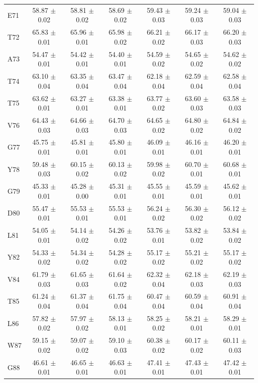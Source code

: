 \documentclass[%
 aip,
 amsmath,amssymb,
 preprint,%
]{revtex4-1}
\begin{document}
\begin{center}
\begin{longtable}{l|c|c|c|c|c|c}
E71 & 58.87 $\pm$ 0.02 & 58.81 $\pm$ 0.02 & 58.69 $\pm$ 0.02 & 59.43 $\pm$ 0.03 & 59.24 $\pm$ 0.03 & 59.04 $\pm$ 0.03 \\
T72 & 65.83 $\pm$ 0.01 & 65.96 $\pm$ 0.01 & 65.98 $\pm$ 0.02 & 66.21 $\pm$ 0.02 & 66.17 $\pm$ 0.03 & 66.20 $\pm$ 0.03 \\
A73 & 54.47 $\pm$ 0.01 & 54.42 $\pm$ 0.01 & 54.40 $\pm$ 0.01 & 54.59 $\pm$ 0.02 & 54.65 $\pm$ 0.02 & 54.62 $\pm$ 0.02 \\
T74 & 63.10 $\pm$ 0.04 & 63.35 $\pm$ 0.04 & 63.47 $\pm$ 0.04 & 62.18 $\pm$ 0.04 & 62.59 $\pm$ 0.04 & 62.58 $\pm$ 0.04 \\
T75 & 63.62 $\pm$ 0.01 & 63.27 $\pm$ 0.01 & 63.38 $\pm$ 0.01 & 63.77 $\pm$ 0.02 & 63.60 $\pm$ 0.03 & 63.58 $\pm$ 0.03 \\
V76 & 64.43 $\pm$ 0.03 & 64.66 $\pm$ 0.03 & 64.70 $\pm$ 0.03 & 64.65 $\pm$ 0.02 & 64.80 $\pm$ 0.02 & 64.84 $\pm$ 0.02 \\
G77 & 45.75 $\pm$ 0.01 & 45.81 $\pm$ 0.01 & 45.80 $\pm$ 0.01 & 46.09 $\pm$ 0.01 & 46.16 $\pm$ 0.01 & 46.20 $\pm$ 0.01 \\
Y78 & 59.48 $\pm$ 0.03 & 60.15 $\pm$ 0.02 & 60.13 $\pm$ 0.02 & 59.98 $\pm$ 0.02 & 60.70 $\pm$ 0.01 & 60.68 $\pm$ 0.01 \\
G79 & 45.33 $\pm$ 0.01 & 45.28 $\pm$ 0.00 & 45.31 $\pm$ 0.01 & 45.55 $\pm$ 0.01 & 45.59 $\pm$ 0.01 & 45.62 $\pm$ 0.01 \\
D80 & 55.47 $\pm$ 0.01 & 55.53 $\pm$ 0.01 & 55.53 $\pm$ 0.01 & 56.24 $\pm$ 0.02 & 56.30 $\pm$ 0.02 & 56.12 $\pm$ 0.02 \\
L81 & 54.05 $\pm$ 0.01 & 54.14 $\pm$ 0.02 & 54.26 $\pm$ 0.02 & 53.76 $\pm$ 0.01 & 53.82 $\pm$ 0.02 & 53.84 $\pm$ 0.02 \\
Y82 & 54.33 $\pm$ 0.02 & 54.34 $\pm$ 0.02 & 54.28 $\pm$ 0.02 & 55.17 $\pm$ 0.02 & 55.21 $\pm$ 0.02 & 55.17 $\pm$ 0.02 \\
V84 & 61.79 $\pm$ 0.03 & 61.65 $\pm$ 0.03 & 61.64 $\pm$ 0.02 & 62.32 $\pm$ 0.04 & 62.18 $\pm$ 0.03 & 62.19 $\pm$ 0.03 \\
T85 & 61.24 $\pm$ 0.04 & 61.37 $\pm$ 0.04 & 61.75 $\pm$ 0.04 & 60.47 $\pm$ 0.04 & 60.59 $\pm$ 0.04 & 60.91 $\pm$ 0.04 \\
L86 & 57.82 $\pm$ 0.02 & 57.97 $\pm$ 0.02 & 58.13 $\pm$ 0.01 & 58.25 $\pm$ 0.02 & 58.21 $\pm$ 0.01 & 58.29 $\pm$ 0.01 \\
W87 & 59.15 $\pm$ 0.02 & 59.07 $\pm$ 0.02 & 59.10 $\pm$ 0.03 & 60.38 $\pm$ 0.02 & 60.17 $\pm$ 0.02 & 60.11 $\pm$ 0.03 \\
G88 & 46.61 $\pm$ 0.01 & 46.65 $\pm$ 0.01 & 46.63 $\pm$ 0.01 & 47.41 $\pm$ 0.01 & 47.43 $\pm$ 0.01 & 47.42 $\pm$ 0.01 \\

\end{longtable}
\end{center}
\end{document}
